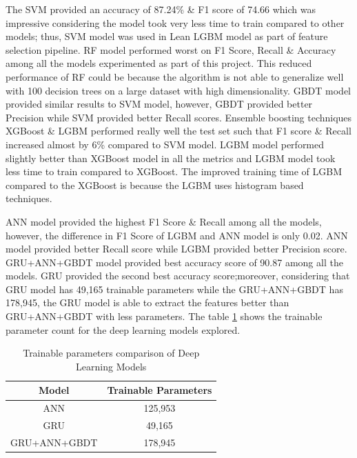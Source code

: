 \documentclass[twoside,11pt,a4paper]{article}
\begin{document}
The \acs{SVM} provided an accuracy of 87.24\% \& F1 score of 74.66 which was impressive considering the model took very less time to train compared to other models; thus, \acs{SVM} model was used in Lean \acs{LGBM} model as part of feature selection pipeline. \acs{RF} model performed worst on F1 Score, Recall \& Accuracy among all the models experimented as part of this project. This reduced performance of \acs{RF} could be because the algorithm is not able to generalize well with 100 decision trees on a large dataset with high dimensionality. \acs{GBDT} model provided similar results to \acs{SVM} model, however, \acs{GBDT} provided better Precision while \acs{SVM} provided better Recall scores. Ensemble boosting techniques \acs{XGBoost} \& \acs{LGBM} performed really well the test set such that F1 score \& Recall increased almost by  6\% compared to \acs{SVM} model. \acs{LGBM} model performed slightly better than \acs{XGBoost} model in all the metrics and \acs{LGBM} model took less time to train compared to \acs{XGBoost}. The improved training time of \acs{LGBM} compared to the \acs{XGBoost} is because the \acs{LGBM} uses histogram based techniques.

\acs{ANN} model provided the highest F1 Score \& Recall among all the models, however, the difference in F1 Score of \acs{LGBM} and \acs{ANN} model is only 0.02. \acs{ANN}  model provided better Recall score while \acs{LGBM} provided better Precision score. \acs{GRU}+\acs{ANN}+\acs{GBDT} model provided best accuracy score of 90.87 among all the models. \acs{GRU} provided the second best accuracy score;moreover, considering that \acs{GRU} model has 49,165 trainable parameters while the \acs{GRU}+\acs{ANN}+\acs{GBDT} has 178,945, the \acs{GRU} model is able to extract the features better than \acs{GRU}+\acs{ANN}+\acs{GBDT} with less parameters. The table \ref{table:trainable_params} shows the trainable parameter count for the deep learning models explored.

\begin{table}[h]
	\begin{center}
		\begin{tabular}{|| c | c ||} 
			\hline
			Model & Trainable Parameters \\ [0.5ex] 
			\hline\hline
			ANN	& 125,953 \\
			\hline
			GRU	& 49,165 \\
			\hline
			GRU+ANN+GBDT	& 178,945 \\
			\hline
		\end{tabular}
		\caption{Trainable parameters comparison of Deep Learning Models}
		\label{table:trainable_params}
	\end{center}
\end{table}
\end{document}

